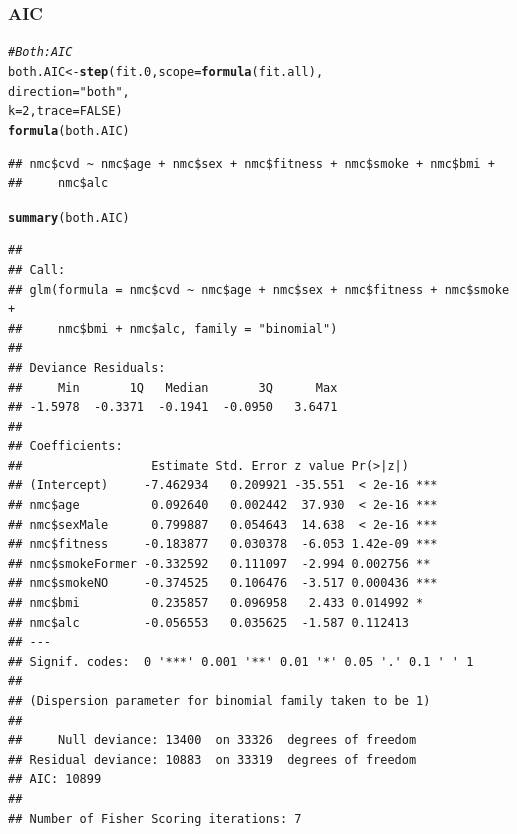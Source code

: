 \documentclass{article}\usepackage[]{graphicx}\usepackage[]{xcolor}
\makeatletter
\newcommand{\hlnum}[1]{\textcolor[rgb]{0.686,0.059,0.569}{#1}}%
\newcommand{\hlstr}[1]{\textcolor[rgb]{0.192,0.494,0.8}{#1}}%
\newcommand{\hlcom}[1]{\textcolor[rgb]{0.678,0.584,0.686}{\textit{#1}}}%
\newcommand{\hlstd}[1]{\textcolor[rgb]{0.345,0.345,0.345}{#1}}%
\newcommand{\hlkwb}[1]{\textcolor[rgb]{0.69,0.353,0.396}{#1}}%
\newcommand{\hlkwc}[1]{\textcolor[rgb]{0.333,0.667,0.333}{#1}}%
\newcommand{\hlkwd}[1]{\textcolor[rgb]{0.737,0.353,0.396}{\textbf{#1}}}%
\newenvironment{kframe}{%
 \def\at@end@of@kframe{}%
 \ifinner\ifhmode%
  \def\at@end@of@kframe{\end{minipage}}%
  \begin{minipage}{\columnwidth}%
 \fi\fi%
 \def\FrameCommand##1{\hskip\@totalleftmargin \hskip-\fboxsep
 \colorbox{shadecolor}{##1}\hskip-\fboxsep
     \hskip-\linewidth \hskip-\@totalleftmargin \hskip\columnwidth}%
 \MakeFramed {\advance\hsize-\width
   \@totalleftmargin\z@ \linewidth\hsize
   \@setminipage}}%
 {\par\unskip\endMakeFramed%
 \at@end@of@kframe}
\newenvironment{knitrout}{}{} %
\makeatother
\begin{document}
        \subsubsection{AIC}
\begin{knitrout}
\color{fgcolor}\begin{kframe}
\begin{alltt}
\hlcom{#Both: AIC }
\hlstd{both.AIC} \hlkwb{<-} \hlkwd{step}\hlstd{(fit.0,} \hlkwc{scope}\hlstd{=}\hlkwd{formula}\hlstd{(fit.all),}
                 \hlkwc{direction}\hlstd{=}\hlstr{"both"}\hlstd{,}
                 \hlkwc{k}\hlstd{=}\hlnum{2}\hlstd{,} \hlkwc{trace}\hlstd{=}\hlnum{FALSE}\hlstd{)}
\hlkwd{formula}\hlstd{(both.AIC)}
\end{alltt}
\begin{verbatim}
## nmc$cvd ~ nmc$age + nmc$sex + nmc$fitness + nmc$smoke + nmc$bmi + 
##     nmc$alc
\end{verbatim}
\begin{alltt}
\hlkwd{summary}\hlstd{(both.AIC)}
\end{alltt}
\begin{verbatim}
## 
## Call:
## glm(formula = nmc$cvd ~ nmc$age + nmc$sex + nmc$fitness + nmc$smoke + 
##     nmc$bmi + nmc$alc, family = "binomial")
## 
## Deviance Residuals: 
##     Min       1Q   Median       3Q      Max  
## -1.5978  -0.3371  -0.1941  -0.0950   3.6471  
## 
## Coefficients:
##                  Estimate Std. Error z value Pr(>|z|)    
## (Intercept)     -7.462934   0.209921 -35.551  < 2e-16 ***
## nmc$age          0.092640   0.002442  37.930  < 2e-16 ***
## nmc$sexMale      0.799887   0.054643  14.638  < 2e-16 ***
## nmc$fitness     -0.183877   0.030378  -6.053 1.42e-09 ***
## nmc$smokeFormer -0.332592   0.111097  -2.994 0.002756 ** 
## nmc$smokeNO     -0.374525   0.106476  -3.517 0.000436 ***
## nmc$bmi          0.235857   0.096958   2.433 0.014992 *  
## nmc$alc         -0.056553   0.035625  -1.587 0.112413    
## ---
## Signif. codes:  0 '***' 0.001 '**' 0.01 '*' 0.05 '.' 0.1 ' ' 1
## 
## (Dispersion parameter for binomial family taken to be 1)
## 
##     Null deviance: 13400  on 33326  degrees of freedom
## Residual deviance: 10883  on 33319  degrees of freedom
## AIC: 10899
## 
## Number of Fisher Scoring iterations: 7
\end{verbatim}
\end{kframe}
\end{knitrout}
          
\end{document}
